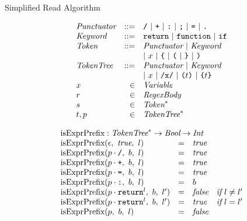 \documentclass[preprint,10pt]{sigplanconf}
\begin{document}
\begin{displayfigure*}{\label{fig:simpleread}Simplified Read Algorithm}
\begin{minipage}[t]{0.5\linewidth}
\[
\begin{array}{lrl}
  \textit{Punctuator} &::=& \texttt{/} ~|~ \texttt{+} ~|~ \texttt{:} ~|~
  \texttt{;} ~|~ \texttt{=} ~|~ \texttt{.}
  \\
  \textit{Keyword} &::=& \texttt{return} ~|~ \texttt{function}~|~
  \texttt{if}
  \\
  \textit{Token} &::=& \textit{Punctuator} ~|~ \textit{Keyword}
  \\
  && |~ x ~|~ \texttt{\{} ~|~ \texttt{(} ~|~ 
  \texttt {\}} ~|~  \texttt{)}
  \\
  \textit{TokenTree} &::=& \textit{Punctuator} ~|~ \textit{Keyword}
  \\
  &&|~ x ~|~ \texttt{/x/} ~|~ \texttt{(}t\texttt{)} ~|~ \texttt{\{}t\texttt{\}}
  \\
  x &\in& \textit{Variable}
  \\
  r &\in& \textit{RegexBody}
  \\
  s &\in& \textit{Token}^{*}
  \\
  t,p &\in& \textit{TokenTree}^{*}
\end{array}
\]
\end{minipage}
\begin{minipage}[t]{0.5\linewidth}
\[
  \begin{array}{lcll}
    \multicolumn{3}{l}{\textrm{isExprPrefix} : \TT^{*} \rightarrow
      \textit{Bool} \rightarrow \textit{Int}}
    \\
    \isobject(\epsilon,~\textit{true},~l) &=& \textit{true}
    \\
    \isobject(p \cdot \div,~b,~l) &=& \textit{true}
    \\
    \isobject(p \cdot \texttt{+},~b,~l) &=& \textit{true}
    \\
    \isobject(p \cdot \texttt{=},~b,~l) &=& \textit{true}
    \\
    \isobject(p \cdot \texttt{:},~b,~l) &=& b
    \\
    \isobject(p \cdot \texttt{return}^{l},~b,~l') &=& \textit{false} 
    & \textit{if}~l \not = l'
    \\
    \isobject(p \cdot \texttt{return}^{l},~b,~l') &=& \textit{true} 
    & \textit{if}~l = l'
    \\
    \isobject(p ,~b,~l) &=& \textit{false}
    \\
  \end{array}
\]
\end{minipage}
\[
  \begin{array}{lcll}

\end{array}\]
\end{displayfigure*}
\end{document}
